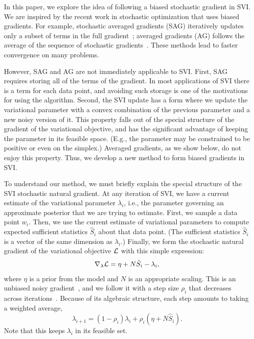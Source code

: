 \documentclass{article} %
\begin{document}
In this paper, we explore the idea of following a biased stochastic
gradient in SVI.  We are inspired by the recent work in stochastic
optimization that uses biased gradients.  For example, stochastic
averaged gradients (SAG) iteratively updates only a subset of terms in
the full gradient~\cite{francisbach}; averaged gradients (AG) follows the
average of the sequence of stochastic gradients~\cite{nesterov2009}.  These
methods lead to faster convergence on many problems.

However, SAG and AG are not immediately applicable to SVI.  First, SAG requires
storing all of the terms of the gradient.  In most
applications of SVI there is a term for each data point, and avoiding
such storage is one of the motivations for using the algorithm.
Second, the SVI update has a form where we update the variational
parameter with a convex combination of the previous parameter and a
new noisy version of it.  This property falls out of the special
structure of the gradient of the variational objective, and has the
significant advantage of keeping the parameter in its feasible space.
(E.g., the parameter may be constrained to be positive or even on the
simplex.)  Averaged gradients, as we show below, do not enjoy this
property. Thus, we develop a new method to form biased gradients in SVI.

To understand our method, we must briefly explain the special
structure of the SVI stochastic natural gradient.  At
any iteration of SVI, we have a current estimate of the variational
parameter $\lambda_i$, i.e., the parameter governing an approximate
posterior that we are trying to estimate.  First, we sample a data
point $w_i$.  Then, we use the current estimate of variational
parameters to compute expected sufficient statistics $\hat{S}_i$ about
that data point.  (The sufficient statistics $\hat{S}_i$ is a vector of
the same dimension as $\lambda_i$.)  Finally, we form the stochastic
natural gradient of the variational objective ${\cal L}$ with this
simple expression:
\begin{equation}
 \label{eq:natural-gradient}
 \nabla_{\lambda} {\cal L} = \eta + N\hat{S}_i- \lambda_i,
\end{equation}
where $\eta$ is a prior from the model and $N$ is an appropriate
scaling.  This is an unbiased noisy gradient~\cite{sato2001,hoffman}, and
we follow it with a step size $\rho_i$ that decreases across
iterations~\cite{robbins}.  Because of its algebraic structure, each
step amounts to taking a weighted average,
\begin{equation}
 \lambda_{i+1} = (1 - \rho_i) \lambda_i + \rho_i (\eta + N \hat{S}_i).
\end{equation}
Note that this keeps $\lambda_i$ in its feasible set.
\end{document}
